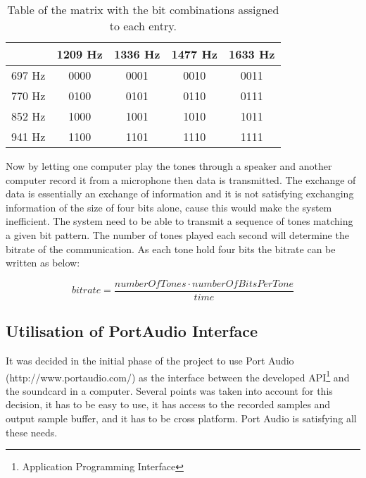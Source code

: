 	\begin{table}[htb]
		\begin{center}
			\begin{tabular}{c|c c c c}
			 & 1209 Hz & 1336 Hz & 1477 Hz & 1633 Hz \\
			\hline
			697 Hz & 0000 & 0001 & 0010 & 0011 \\
			770 Hz & 0100 & 0101 & 0110 & 0111 \\
			852 Hz & 1000 & 1001 & 1010 & 1011 \\
			941 Hz & 1100 & 1101 & 1110 & 1111 \\
			\end{tabular}
		\end{center}
		\caption{Table of the matrix with the bit combinations assigned to each entry.}
		\label{tab:DTMF_mapping}
	\end{table}
	
	Now by letting one computer play the tones through a speaker and another computer record it from
	a microphone then data is transmitted. The exchange of data is essentially an exchange
	of information and it is not satisfying exchanging information of the size of four bits alone,
	cause this would make the system inefficient. The system need to be able to transmit a sequence
	of tones matching a given bit pattern. The number of tones played each second will determine the
	bitrate of the communication. As each tone hold four bits the bitrate can be written as below:
	\begin{center}\begin{equation}bitrate = \frac{numberOfTones \cdot numberOfBitsPerTone}{time}\end{equation}\end{center}
	
	\subsection{Utilisation of PortAudio Interface}
	It was decided in the initial phase of the project to use Port Audio (http://www.portaudio.com/)
	as the interface between the developed API\footnote{Application Programming Interface} and the 
	soundcard in a computer. Several points was taken into account for this decision, it has to be easy to use,
	it has access to the recorded samples and output sample buffer, and it has to be cross platform.
	Port Audio is satisfying all these needs.
	
